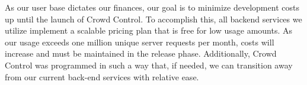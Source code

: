 As our user base dictates our finances, our goal is to minimize development costs up until the launch of Crowd Control. To accomplish this, all backend services we utilize implement a scalable pricing plan that is free for low usage amounts. As our usage exceeds one million unique server requests per month, costs will increase and must be maintained in the release phase. Additionally, Crowd Control was programmed in such a way that, if needed, we can transition away from our current back-end services with relative ease.
